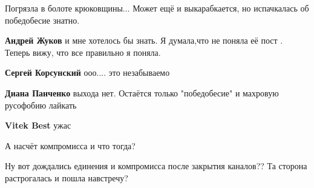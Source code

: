 \begin{itemize}
\begin{itemize}
Погрязла в болоте крюковщины... Может ещё и выкарабкается, но испачкалась об
победобесие знатно.


 
\textbf{Андрей Жуков} и мне хотелось бы знать. Я думала,что не поняла её пост . Теперь вижу, что все правильно я поняла.

 
\textbf{Сергей Корсунский} ооо.... это незабываемо

 
\textbf{Диана Панченко} выхода нет. Остаётся только "победобесие" и махровую русофобию лайкать


 
\textbf{Vitek Best} ужас

 

А насчёт компромисса и что тогда?

Ну вот дождались единения и компромисса после закрытия каналов?? Та сторона
растрогалась и пошла навстречу?

 

\end{itemize}
\end{itemize}
